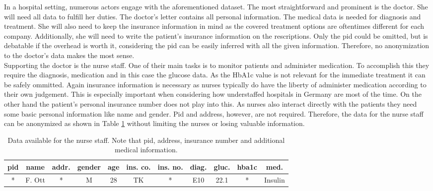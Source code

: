 In a hospital setting, numerous actors engage with the aforementioned dataset. The most straightforward and prominent is the doctor. She will need all data to fulfill her duties. The doctor's letter contains all personal information. The medical data is needed for diagnosis and treatment. 
She will also need to keep the insurance information in mind as the covered treatment options are oftentimes different for each company. Additionally, she will need to write the patient's insurance information on the rescriptions. Only the pid could be omitted, but is debatable if the overhead is worth it, considering the pid can be easily inferred with all the given information.
Therefore, no anonymization to the doctor's data makes the most sense. \\
Supporting the doctor is the nurse staff. One of their main tasks is to monitor patients and administer medication. To accomplish this they require the diagnosis, medication and in this case the glucose data. As the HbA1c value is not relevant for the immediate treatment it can be safely ommitted. 
Again insurance information is necessary as nurses typically do have the liberty of administer medication according to their own judgement. This is especially important when considering how understaffed hospitals in Germany are most of the time. On the other hand the patient's personal insurance number does not play into this. As nurses also interact directly with the patients they need some basic personal information like name and gender. 
Pid and address, however, are not required. Therefore, the data for the nurse staff can be anonymized as shown in Table \ref{table:nurse} without limiting the nurses or losing valuable information. 

\bigskip

\begin{table}[ht]
    \begin{center}
    \footnotesize{
        \renewcommand{\arraystretch}{1.5}
        \begin{tabular}{ | c | c | c | c | c | c | c | c | c | c | c | } 
            \hline
            pid & name & addr. & gender & age & ins. co. & ins. no. & diag. & gluc. & hba1c & med. \\
            \hline
            * & F. Ott & * & M & 28 & TK & * & E10 & 22.1 & * & Insulin \\
            \hline
        \end{tabular}
    }
    \caption{Data available for the nurse staff. Note that pid, address, insurance number and additional medical information.}
    \label{table:nurse}
    \end{center}
\end{table}

